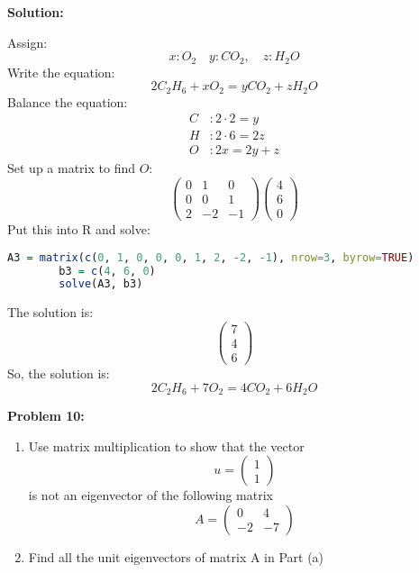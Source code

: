 \documentclass[12pt]{article}
\newenvironment{problem}[1]{
    \textbf{Problem #1:}
}{
    \rmfamily \vspace{1em}
}
\newenvironment{solution}{
    \textbf{Solution:}
    
}{
    
    \vspace{2em}
}
\begin{document}
\begin{solution}
    Assign:
    \[
        x : O_2 \quad y : CO_2, \quad z : H_2O
    \]
    Write the equation:
    \[
        2C_2H_6 + xO_2 = yCO_2 + zH_2O
    \]
    Balance the equation:
    \[
        \begin{aligned}
            C&: 2 \cdot 2 = y \\
            H&: 2 \cdot 6 = 2z \\
            O&: 2x = 2y + z
        \end{aligned}
    \]
    Set up a matrix to find $O$:
    \[
        \begin{pmatrix}
            0 & 1 & 0 \\
            0 & 0 & 1 \\
            2 & -2 & -1
        \end{pmatrix}
        \begin{pmatrix}
            4 \\
            6 \\
            0
        \end{pmatrix}
    \]
    Put this into R and solve:
    \begin{lstlisting}[language=R]
        A3 = matrix(c(0, 1, 0, 0, 0, 1, 2, -2, -1), nrow=3, byrow=TRUE)
        b3 = c(4, 6, 0)
        solve(A3, b3)
    \end{lstlisting}
    The solution is:
    \[
        \begin{pmatrix}
            7 \\
            4 \\
            6
        \end{pmatrix}
    \]
    So, the solution is:
    \[
        2C_2H_6 + 7O_2 = 4CO_2 + 6H_2O
    \]
\end{solution}

\begin{problem}{10}
    \begin{enumerate}[label=(\alph*)]
        \item Use matrix multiplication to show that the vector
        \[
            u = \begin{pmatrix}
                1 \\
                1
            \end{pmatrix}
        \]
        is not an eigenvector of the following matrix
        \[
            A = \begin{pmatrix}
                0 & 4 \\
                -2 & -7
            \end{pmatrix}
        \]
        \item Find all the unit eigenvectors of matrix A in Part (a)
    \end{enumerate}
\end{problem}
\end{document}
